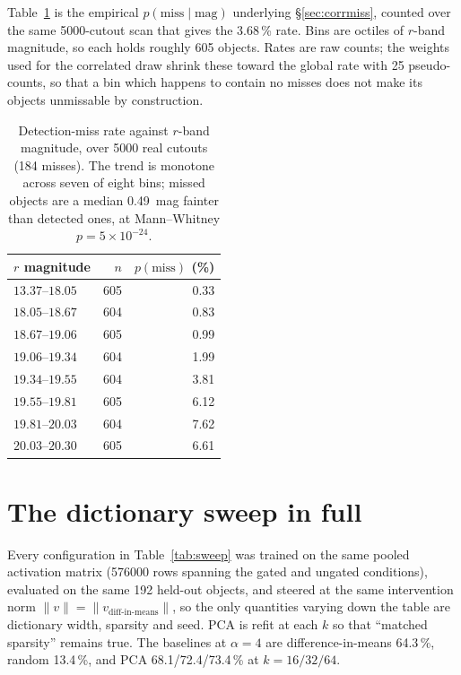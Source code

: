 \documentclass[11pt]{article}
\begin{document}
Table~\ref{tab:missmag} is the empirical $p(\text{miss}\mid\text{mag})$ underlying
\S\ref{sec:corrmiss}, counted over the same 5000-cutout scan that gives the 3.68\,\% rate. Bins
are octiles of $r$-band magnitude, so each holds roughly 605 objects. Rates are raw counts; the
weights used for the correlated draw shrink these toward the global rate with 25 pseudo-counts,
so that a bin which happens to contain no misses does not make its objects unmissable by
construction.

\begin{table}[H]
\centering\small
\caption{Detection-miss rate against $r$-band magnitude, over 5000 real cutouts (184 misses).
The trend is monotone across seven of eight bins; missed objects are a median \SI{0.49}{mag}
fainter than detected ones, at Mann--Whitney $p=5\times10^{-24}$.}
\label{tab:missmag}
\begin{tabular}{lrr}
\toprule
$r$ magnitude & $n$ & $p(\text{miss})$ (\%) \\
\midrule
$13.37$--$18.05$ & 605 & 0.33 \\
$18.05$--$18.67$ & 604 & 0.83 \\
$18.67$--$19.06$ & 605 & 0.99 \\
$19.06$--$19.34$ & 604 & 1.99 \\
$19.34$--$19.55$ & 604 & 3.81 \\
$19.55$--$19.81$ & 605 & 6.12 \\
$19.81$--$20.03$ & 604 & 7.62 \\
$20.03$--$20.30$ & 605 & 6.61 \\
\bottomrule
\end{tabular}
\end{table}

\section{The dictionary sweep in full}
\label{app:sweep}

Every configuration in Table~\ref{tab:sweep} was trained on the same pooled activation matrix
(\num{576000} rows spanning the gated and ungated conditions), evaluated on the same 192 held-out
objects, and steered at the same intervention norm $\|v\|=\|v_{\text{diff-in-means}}\|$, so the
only quantities varying down the table are dictionary width, sparsity and seed. PCA is refit at
each $k$ so that ``matched sparsity'' remains true. The baselines at $\alpha=4$ are
difference-in-means 64.3\,\%, random 13.4\,\%, and PCA 68.1/72.4/73.4\,\% at $k=16/32/64$.
\end{document}
